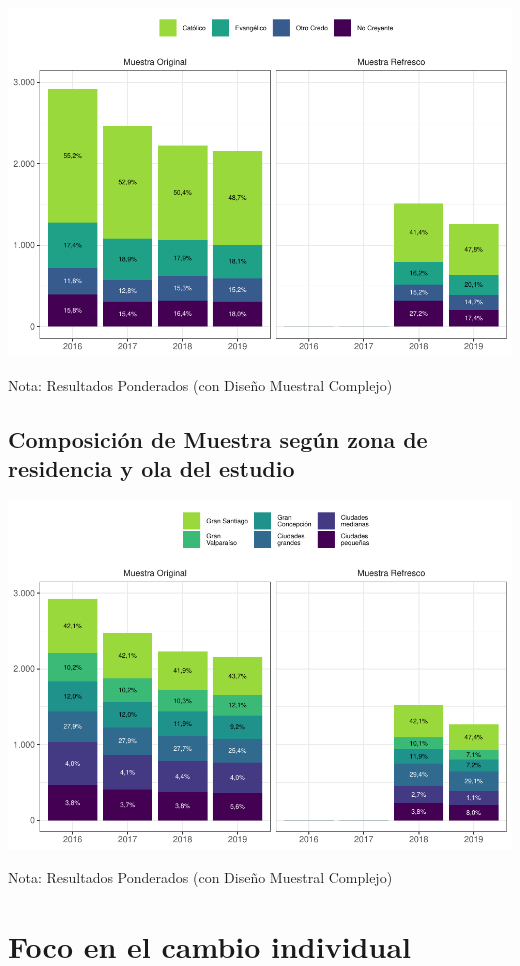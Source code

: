 \documentclass[
  12pt,
]{book}
\begin{document}
\begin{center}\includegraphics[width=0.75\linewidth]{concepto-medicion_files/figure-latex/unnamed-chunk-14-1} \end{center}

Nota: Resultados Ponderados (con Diseño Muestral Complejo)

\hypertarget{composiciuxf3n-de-muestra-seguxfan-zona-de-residencia-y-ola-del-estudio}{%
\section{Composición de Muestra según zona de residencia y ola del estudio}\label{composiciuxf3n-de-muestra-seguxfan-zona-de-residencia-y-ola-del-estudio}}

\begin{center}\includegraphics[width=0.75\linewidth]{concepto-medicion_files/figure-latex/unnamed-chunk-15-1} \end{center}

Nota: Resultados Ponderados (con Diseño Muestral Complejo)

\hypertarget{foco-en-el-cambio-individual}{%
\chapter{Foco en el cambio individual}\label{foco-en-el-cambio-individual}}
\end{document}
